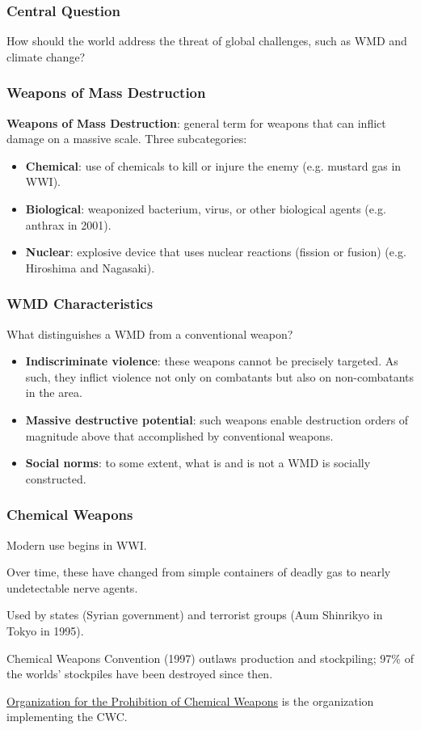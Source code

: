 \documentclass[handout]{beamer}
\begin{document}
\begin{frame} 
\frametitle{\LARGE{Central Question}}
\centering
	\Large{How should the world address the threat of global challenges, such as WMD and climate change?}
	
\end{frame}


\begin{frame} 
\frametitle{\LARGE{Weapons of Mass Destruction}}
\textbf{Weapons of Mass Destruction}: general term for weapons that can inflict damage on a massive scale. Three subcategories: \pause
\begin{itemize}
		\item \textbf{Chemical}: use of chemicals to kill or injure the enemy (e.g. mustard gas in WWI). \pause
		\item \textbf{Biological}: weaponized bacterium, virus, or other biological agents (e.g. anthrax in 2001). \pause
		\item \textbf{Nuclear}: explosive device that uses nuclear reactions (fission or fusion) (e.g. Hiroshima and Nagasaki).
\end{itemize}
\end{frame}

\begin{frame} 
	\frametitle{\LARGE{WMD Characteristics}}
What distinguishes a WMD from a conventional weapon? \pause
	\begin{itemize}
		\item \textbf{Indiscriminate violence}: these weapons cannot be precisely targeted. As such, they inflict violence not only on combatants but also on non-combatants in the area. \pause
		\item \textbf{Massive destructive potential}: such weapons enable destruction orders of magnitude above that accomplished by conventional weapons. \pause
		\item \textbf{Social norms}: to some extent, what is and is not a WMD is socially constructed.
	\end{itemize}
\end{frame}

\begin{frame} 
\frametitle{\LARGE{Chemical Weapons}}
\begin{itemize}
	\large{
		\item Modern use begins in WWI. \pause
		\item Over time, these have changed from simple containers of deadly gas to nearly undetectable nerve agents. \pause
		\item Used by states (Syrian government) and terrorist groups (Aum Shinrikyo in Tokyo in 1995). \pause 
		\item Chemical Weapons Convention (1997) outlaws production and stockpiling; 97\% of the worlds' stockpiles have been destroyed since then. 
		\item \href{https://www.opcw.org/}{Organization for the Prohibition of Chemical Weapons} is the organization implementing the CWC.
	}
\end{itemize}
\end{frame}
\end{document}
